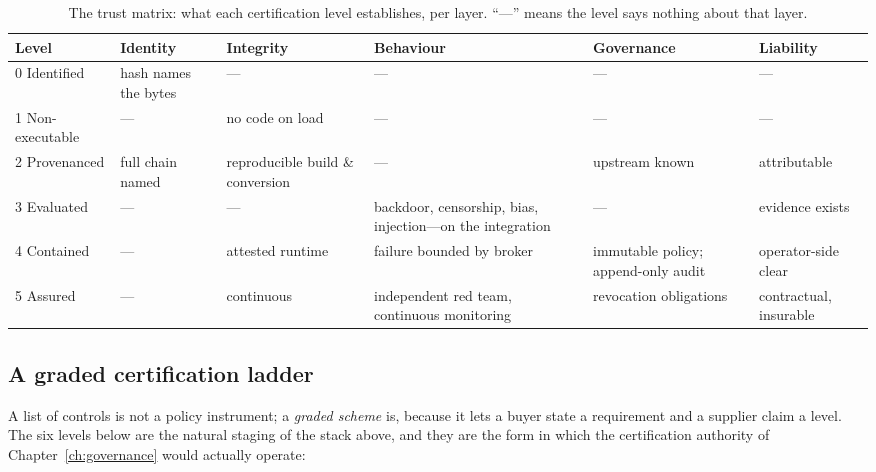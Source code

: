 \begin{table}[htbp]
  \centering
  \scriptsize
  \caption{The trust matrix: what each certification level establishes, per layer. ``---'' means the level says nothing about that layer.}
  \label{tab:trustmatrix}
  \setlength{\tabcolsep}{3pt}
  \begin{tabular}{p{16mm}p{23mm}p{23mm}p{26mm}p{23mm}p{23mm}}
    \toprule
    Level & Identity & Integrity & Behaviour & Governance & Liability \\
    \midrule
    0 Identified & hash names the bytes & --- & --- & --- & --- \\
    1 Non-executable & --- & no code on load & --- & --- & --- \\
    2 Provenanced & full chain named & reproducible build \& conversion & --- & upstream known & attributable \\
    3 Evaluated & --- & --- & backdoor, censorship, bias, injection---on the integration & --- & evidence exists \\
    4 Contained & --- & attested runtime & failure bounded by broker & immutable policy; append-only audit & operator-side clear \\
    5 Assured & --- & continuous & independent red team, continuous monitoring & revocation obligations & contractual, insurable \\
    \bottomrule
  \end{tabular}
\end{table}

\subsection{A graded certification ladder}
\label{sec:certladder}

A list of controls is not a policy instrument; a \emph{graded scheme} is, because it lets a buyer state a requirement and a supplier claim a level. The six levels below are the natural staging of the stack above, and they are the form in which the certification authority of Chapter~\ref{ch:governance} would actually operate:

